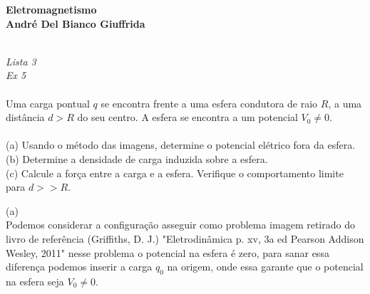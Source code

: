 \documentclass[a4paper,11pt]{exam}
\begin{document}
\begingroup 
	  \bf \Large Eletromagnetismo\\
	  \indent \normalsize André Del Bianco Giuffrida
	\endgroup
	\\ \quad
	\\
	\large{
	\emph{Lista 3 \\ Ex 5}
        \\
	\\ \indent Uma carga pontual $q$ se encontra frente a uma esfera condutora de raio $R$, a uma distância $d > R$ do seu centro. A esfera se encontra a um potencial $V_0 \ne 0$.
        \\
        \\
        (a) \indent Usando o método das imagens, determine o potencial elétrico fora da esfera. 
        \\
        (b) \indent Determine a densidade de carga induzida sobre a esfera.
        \\
        (c) \indent Calcule a força entre a carga e a esfera. Verifique o comportamento limite para $d >>R$.

	\normalsize


	\begin{center}
	\end{center}
	(a)\\
	\indent Podemos considerar a configuração asseguir como problema imagem retirado do livro de referência  (Griffiths, D. J.) "Eletrodinâmica p. xv, 3a ed Pearson Addison Wesley, 2011" nesse problema o potencial na esfera é zero, para sanar essa diferença podemos inserir a carga $q_0$ na origem, onde essa garante que o potencial na esfera seja $V_0 \ne 0$.
	
	\begin{center}
	\end{center}
	
}
\end{document}
